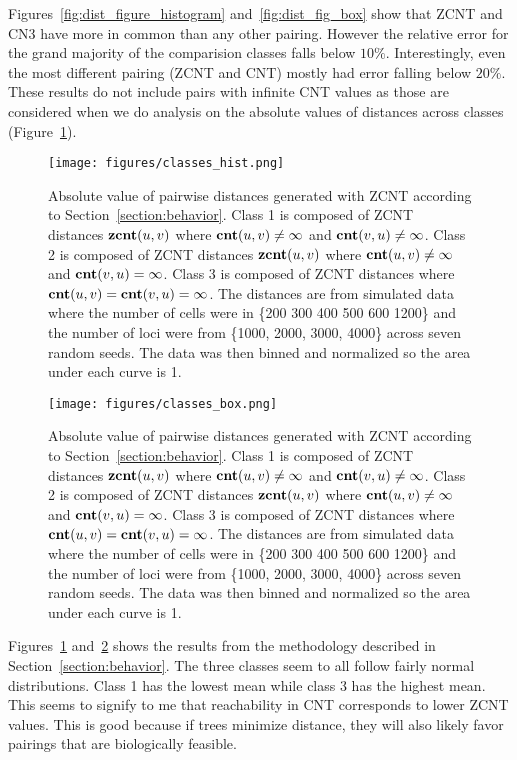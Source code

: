 Figures~\ref{fig:dist_figure_histogram} and~\ref{fig:dist_fig_box} show that ZCNT and CN3 have more in common than any other pairing. However the relative error for the grand majority of the comparision classes falls below $10\%$. Interestingly, even the most different pairing (ZCNT and CNT) mostly had error falling below $20\%$. These results do not include pairs with infinite CNT values as those are considered when we do analysis on the absolute values of distances across classes (Figure~\ref{fig:classes_hist}). 

\begin{figure}[ht]
    \centering
    \texttt{[image: figures/classes\_hist.png]}
    \caption{Absolute value of pairwise distances generated with ZCNT according to Section~\ref{section:behavior}. Class 1 is composed of ZCNT distances $\textbf{zcnt}(u, v)$ where $\textbf{cnt}(u, v) \neq \infty$ and $\textbf{cnt}(v, u) \neq \infty$. Class 2 is composed of ZCNT distances $\textbf{zcnt}(u, v)$ where $\textbf{cnt}(u, v) \neq \infty$ and $\textbf{cnt}(v, u) = \infty$. Class 3 is composed of ZCNT distances where $\textbf{cnt}(u, v) = \textbf{cnt}(v, u) = \infty$. The distances are from simulated data where the number of cells were in \{200 300 400 500 600 1200\} and the number of loci were from \{1000, 2000, 3000, 4000\} across seven random seeds. The data was then binned and normalized so the area under each curve is 1.}\label{fig:classes_hist}
\end{figure}

\begin{figure}[ht]
    \centering
    \texttt{[image: figures/classes\_box.png]}
    \caption{Absolute value of pairwise distances generated with ZCNT according to Section~\ref{section:behavior}. Class 1 is composed of ZCNT distances $\textbf{zcnt}(u, v)$ where $\textbf{cnt}(u, v) \neq \infty$ and $\textbf{cnt}(v, u) \neq \infty$. Class 2 is composed of ZCNT distances $\textbf{zcnt}(u, v)$ where $\textbf{cnt}(u, v) \neq \infty$ and $\textbf{cnt}(v, u) = \infty$. Class 3 is composed of ZCNT distances where $\textbf{cnt}(u, v) = \textbf{cnt}(v, u) = \infty$. The distances are from simulated data where the number of cells were in \{200 300 400 500 600 1200\} and the number of loci were from \{1000, 2000, 3000, 4000\} across seven random seeds. The data was then binned and normalized so the area under each curve is 1.}\label{fig:classes_box}
\end{figure}

Figures~\ref{fig:classes_hist} and~\ref{fig:classes_box} shows the results from the methodology described in Section~\ref{section:behavior}. The three classes seem to all follow fairly normal distributions. Class 1 has the lowest mean while class 3 has the highest mean. This seems to signify to me that reachability in CNT corresponds to lower ZCNT values. This is good because if trees minimize distance, they will also likely favor pairings that are biologically feasible. 


